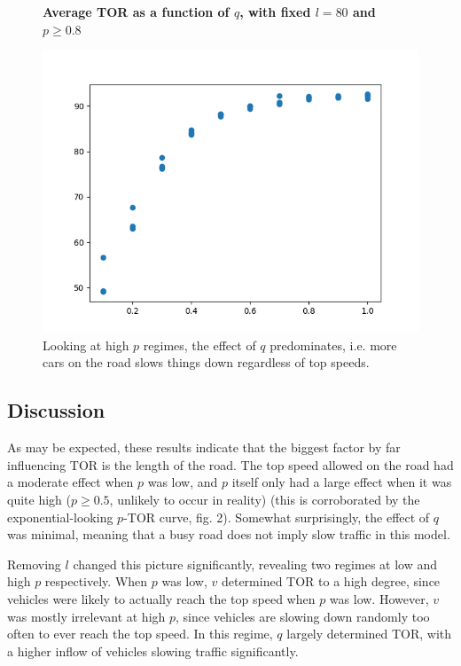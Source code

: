 \documentclass{article}
\begin{document}
\begin{figure}
\textbf{\large Average TOR as a function of $q$, with fixed $l=80$ and $p \geq 0.8$}\par\medskip
{}
\includegraphics[scale = 0.55, left]{./data/phase1/q_vs_timeOnRoad_l=80_highp.png}
\vspace*{0.1cm}\hspace*{4.5cm}{\large $q$}
\caption{\label{fig} Looking at high $p$ regimes, the effect of $q$ predominates, i.e. more cars on the road slows things down regardless of top speeds.}
\end{figure}

\subsection*{Discussion}

As may be expected, these results indicate that the biggest factor by far influencing TOR is the length of the road. The top speed allowed on the road had a moderate effect when $p$ was low, and $p$ itself only had a large effect when it was quite high ($p \geq 0.5$, unlikely to occur in reality) (this is corroborated by the exponential-looking $p$-TOR curve, fig. 2). Somewhat surprisingly, the effect of $q$ was minimal, meaning that a busy road does not imply slow traffic in this model.

Removing $l$ changed this picture significantly, revealing two regimes at low and high $p$ respectively. When $p$ was low, $v$ determined TOR to a high degree, since vehicles were likely to actually reach the top speed when $p$ was low. However, $v$ was mostly irrelevant at high $p$, since vehicles are slowing down randomly too often to ever reach the top speed. In this regime, $q$ largely determined TOR, with a higher inflow of vehicles slowing traffic significantly.
\end{document}

